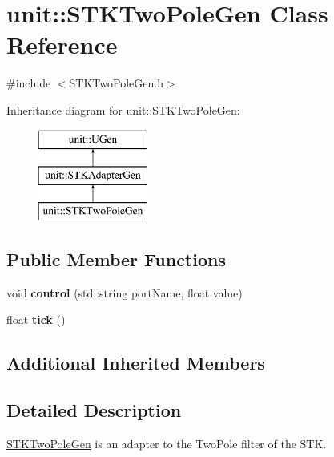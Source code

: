 \hypertarget{classunit_1_1STKTwoPoleGen}{}\section{unit\+:\+:S\+T\+K\+Two\+Pole\+Gen Class Reference}
\label{classunit_1_1STKTwoPoleGen}


{\ttfamily \#include $<$S\+T\+K\+Two\+Pole\+Gen.\+h$>$}

Inheritance diagram for unit\+:\+:S\+T\+K\+Two\+Pole\+Gen\+:\begin{figure}[H]
\begin{center}
\leavevmode
\includegraphics[height=3.000000cm]{classunit_1_1STKTwoPoleGen}
\end{center}
\end{figure}
\subsection*{Public Member Functions}
\begin{DoxyCompactItemize}
\item 
void {\bfseries control} (std\+::string port\+Name, float value)\hypertarget{classunit_1_1STKTwoPoleGen_a71b904b3c03c69f5fb25bbf2449fb802}{}\label{classunit_1_1STKTwoPoleGen_a71b904b3c03c69f5fb25bbf2449fb802}

\item 
float {\bfseries tick} ()\hypertarget{classunit_1_1STKTwoPoleGen_ade033932ab7e85b7f3d6a69461eef372}{}\label{classunit_1_1STKTwoPoleGen_ade033932ab7e85b7f3d6a69461eef372}

\end{DoxyCompactItemize}
\subsection*{Additional Inherited Members}


\subsection{Detailed Description}
\hyperlink{classunit_1_1STKTwoPoleGen}{S\+T\+K\+Two\+Pole\+Gen} is an adapter to the Two\+Pole filter of the S\+TK.

